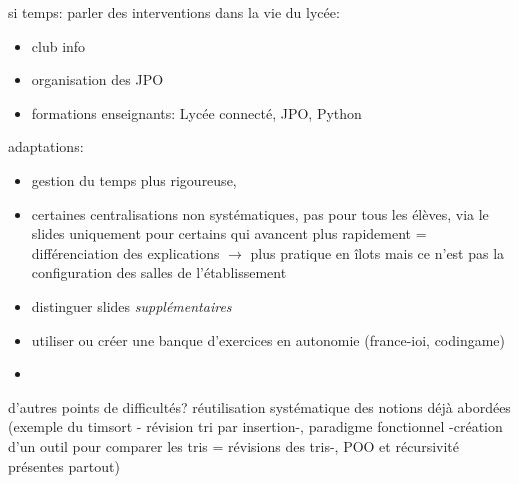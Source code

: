 \documentclass[a4paper,11pt]{article}
\begin{document}
si temps: parler des interventions dans la vie du lycée:
\begin{itemize}
    \item club info
    \item organisation des JPO
    \item formations enseignants: Lycée connecté, JPO, Python
\end{itemize}
adaptations:
\begin{itemize}
    \item gestion du temps plus rigoureuse,
    \item certaines centralisations non systématiques, pas pour tous les élèves, via le slides uniquement pour certains qui avancent plus rapidement = différenciation des explications $\rightarrow$ plus pratique en îlots mais ce n'est pas la configuration des salles de l'établissement
    \item distinguer slides \emph{supplémentaires}
    \item utiliser ou créer une banque d'exercices en autonomie (france-ioi, codingame)
    \item 
\end{itemize}


d'autres points de difficultés?
réutilisation systématique des notions déjà abordées (exemple du timsort - révision tri par insertion-, paradigme fonctionnel -création d'un outil pour comparer les tris = révisions des tris-, POO et récursivité présentes partout)

\pagebreak
\end{document}
